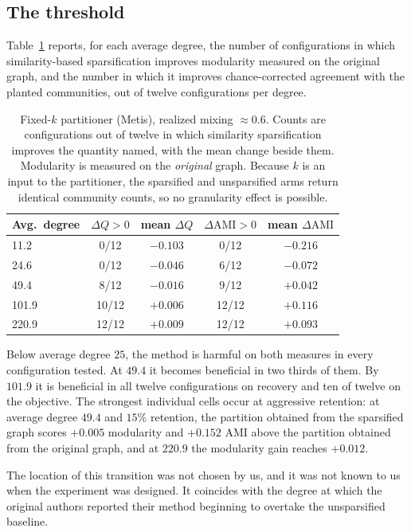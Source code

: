 \subsection{The threshold}

Table~\ref{tab:boundary} reports, for each average degree, the number of
configurations in which similarity-based sparsification improves modularity
measured on the original graph, and the number in which it improves
chance-corrected agreement with the planted communities, out of twelve
configurations per degree.

\begin{table}[t]
\centering
\caption{Fixed-$k$ partitioner (Metis), realized mixing $\approx 0.6$. Counts are
configurations out of twelve in which similarity sparsification improves the
quantity named, with the mean change beside them. Modularity is measured on the
\emph{original} graph. Because $k$ is an input to the partitioner, the sparsified
and unsparsified arms return identical community counts, so no granularity effect
is possible.}
\label{tab:boundary}
\begin{tabular}{@{}lcccc@{}}
\toprule
Avg.\ degree & $\Delta Q > 0$ & mean $\Delta Q$ & $\Delta\mathrm{AMI} > 0$ & mean $\Delta\mathrm{AMI}$\\
\midrule
11.2  & 0/12  & $-0.103$ & 0/12  & $-0.216$\\
24.6  & 0/12  & $-0.046$ & 6/12  & $-0.072$\\
49.4  & 8/12  & $-0.016$ & 9/12  & $+0.042$\\
101.9 & 10/12 & $+0.006$ & 12/12 & $+0.116$\\
220.9 & 12/12 & $+0.009$ & 12/12 & $+0.093$\\
\bottomrule
\end{tabular}
\end{table}

Below average degree $25$, the method is harmful on both measures in every
configuration tested. At $49.4$ it becomes beneficial in two thirds of them. By
$101.9$ it is beneficial in all twelve configurations on recovery and ten of
twelve on the objective. The strongest individual cells occur at aggressive
retention: at average degree $49.4$ and $15\%$ retention, the partition obtained
from the sparsified graph scores $+0.005$ modularity and $+0.152$ AMI above the
partition obtained from the original graph, and at $220.9$ the modularity gain
reaches $+0.012$.

The location of this transition was not chosen by us, and it was not known to us
when the experiment was designed. It coincides with the degree at which the
original authors reported their method beginning to overtake the unsparsified
baseline.


